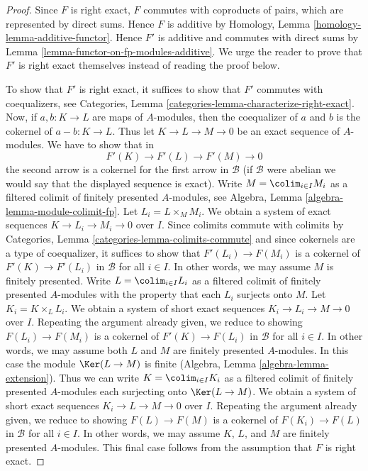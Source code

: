 \begin{proof}
Since $F$ is right exact, $F$ commutes with coproducts of pairs, which are
represented by direct sums. Hence $F$ is additive by
Homology, Lemma \ref{homology-lemma-additive-functor}.
Hence $F'$ is additive and commutes with direct sums by
Lemma \ref{lemma-functor-on-fp-modules-additive}.
We urge the reader to prove that $F'$ is right exact themselves
instead of reading the proof below.

\medskip\noindent
To show that $F'$ is right exact, it suffices to show that $F'$ commutes
with coequalizers, see
Categories, Lemma \ref{categories-lemma-characterize-right-exact}.
Now, if $a, b : K \to L$ are maps of $A$-modules, then the
coequalizer of $a$ and $b$ is the cokernel of $a - b : K \to L$.
Thus let $K \to L \to M \to 0$ be an exact sequence
of $A$-modules. We have to show that in
$$
F'(K) \to F'(L) \to F'(M) \to 0
$$
the second arrow is a cokernel for the first arrow in $\mathcal{B}$
(if $\mathcal{B}$ were abelian we would say that the displayed sequence
is exact).
Write $M = \colim_{i \in I} M_i$ as a filtered colimit of finitely
presented $A$-modules, see
Algebra, Lemma \ref{algebra-lemma-module-colimit-fp}.
Let $L_i = L \times_M M_i$. 
We obtain a system of exact sequences $K \to L_i \to M_i \to 0$ over $I$.
Since colimits commute with colimits by
Categories, Lemma \ref{categories-lemma-colimits-commute}
and since cokernels are a type of coequalizer,
it suffices to show that $F'(L_i) \to F(M_i)$ is a cokernel of
$F'(K) \to F'(L_i)$ in $\mathcal{B}$ for all $i \in I$. In other words, we may
assume $M$ is finitely presented. Write $L = \colim_{i \in I} L_i$
as a filtered colimit of finitely presented $A$-modules
with the property that each $L_i$ surjects onto $M$.
Let $K_i = K \times_L L_i$. We obtain a system of short exact sequences
$K_i \to L_i \to M \to 0$ over $I$.
Repeating the argument already given, we reduce to showing
$F(L_i) \to F(M_i)$ is a cokernel of
$F'(K) \to F(L_i)$ in $\mathcal{B}$ for all $i \in I$.
In other words, we may assume both
$L$ and $M$ are finitely presented $A$-modules.
In this case the module $\Ker(L \to M)$ is finite
(Algebra, Lemma \ref{algebra-lemma-extension}).
Thus we can write $K = \colim_{i \in I} K_i$ as a filtered colimit
of finitely presented $A$-modules each surjecting onto $\Ker(L \to M)$.
We obtain a system of short exact sequences
$K_i \to L \to M \to 0$ over $I$.
Repeating the argument already given, we reduce to showing
$F(L) \to F(M)$ is a cokernel of
$F(K_i) \to F(L)$ in $\mathcal{B}$ for all $i \in I$.
In other words, we may assume $K$, $L$, and $M$
are finitely presented $A$-modules. This final case follows
from the assumption that $F$ is right exact.
\end{proof}

